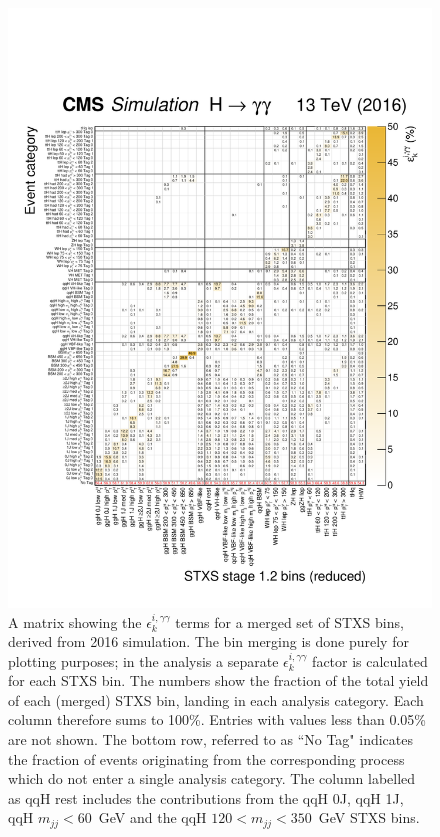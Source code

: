 \begin{figure}[hptb]
  \centering
  \includegraphics[width=1\textwidth]{Figures/app_matrices/migrationMatrix_2016_thesis.pdf}
  \caption[Efficiency times acceptance matrix from 2016 simulation]
  {
    A matrix showing the $\epsilon^{i,\gamma\gamma}_{k}$ terms for a merged set of STXS bins, derived from 2016 simulation. The bin merging is done purely for plotting purposes; in the analysis a separate $\epsilon^{i,\gamma\gamma}_{k}$ factor is calculated for each STXS bin. The numbers show the fraction of the total yield of each (merged) STXS bin, landing in each analysis category. Each column therefore sums to 100\%. Entries with values less than 0.05\% are not shown. The bottom row, referred to as ``No Tag" indicates the fraction of events originating from the corresponding process which do not enter a single analysis category. The column labelled as qqH rest includes the contributions from the qqH 0J, qqH 1J, qqH $m_{jj}<60$~GeV and the qqH $120<m_{jj}<350$~GeV STXS bins.
  }
  \label{fig:ea_2016}
\end{figure}

